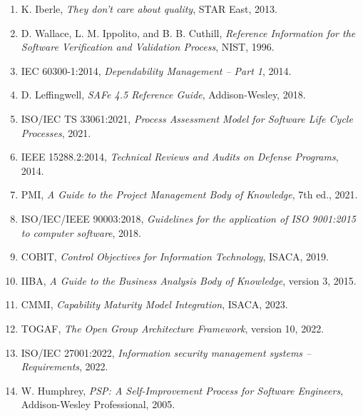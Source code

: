 \begin{enumerate}
  \item K. Iberle, \textit{They don't care about quality}, STAR East, 2013.
  \item D. Wallace, L. M. Ippolito, and B. B. Cuthill, \textit{Reference Information for the Software Verification and Validation Process}, NIST, 1996.
  \item IEC 60300-1:2014, \textit{Dependability Management -- Part 1}, 2014.
  \item D. Leffingwell, \textit{SAFe 4.5 Reference Guide}, Addison-Wesley, 2018.
  \item ISO/IEC TS 33061:2021, \textit{Process Assessment Model for Software Life Cycle Processes}, 2021.
  \item IEEE 15288.2:2014, \textit{Technical Reviews and Audits on Defense Programs}, 2014.
  \item PMI, \textit{A Guide to the Project Management Body of Knowledge}, 7th ed., 2021.
  \item ISO/IEC/IEEE 90003:2018, \textit{Guidelines for the application of ISO 9001:2015 to computer software}, 2018.
  \item COBIT, \textit{Control Objectives for Information Technology}, ISACA, 2019.
  \item IIBA, \textit{A Guide to the Business Analysis Body of Knowledge}, version 3, 2015.
  \item CMMI, \textit{Capability Maturity Model Integration}, ISACA, 2023.
  \item TOGAF, \textit{The Open Group Architecture Framework}, version 10, 2022.
  \item ISO/IEC 27001:2022, \textit{Information security management systems -- Requirements}, 2022.
  \item W. Humphrey, \textit{PSP: A Self-Improvement Process for Software Engineers}, Addison-Wesley Professional, 2005.
\end{enumerate}
